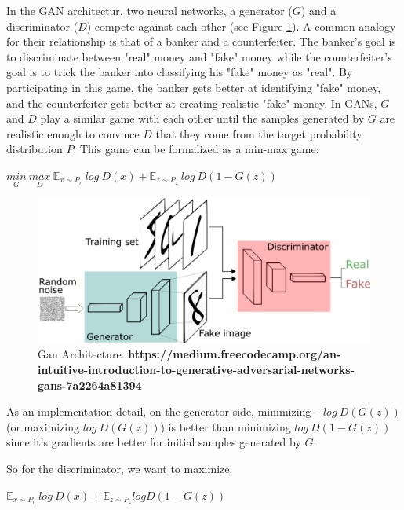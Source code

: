 \documentclass{article}
\begin{document}
In the GAN architectur, two neural networks, a generator ($G$) and a discriminator ($D$) compete against each other (see Figure \ref{fig:gan}). A common analogy for their relationship is that of a banker and a counterfeiter. The banker's goal is to discriminate between "real" money and "fake" money while the counterfeiter's goal is to trick the banker into classifying his "fake" money as "real". By participating in this game, the banker gets better at identifying "fake" money, and the counterfeiter gets better at creating realistic "fake" money. In GANs, $G$ and $D$ play a similar game with each other until the samples generated by $G$ are realistic enough to convince $D$ that they come from the target probability distribution $P$. This game can be formalized as a min-max game:

\begin{center}
	$\underset{G}{min}~\underset{D}{max}~\mathbb{E}_{x \sim P_r}~log~D(x) + \mathbb{E}_{z \sim P_z}~log~D(1-G(z))$
\end{center}

\begin{figure}[h!]
	\centering
	\includegraphics[width=\linewidth]{media/gan.png}
	\caption{Gan Architecture.  \textbf{https://medium.freecodecamp.org/an-intuitive-introduction-to-generative-adversarial-networks-gans-7a2264a81394}}
	\label{fig:gan}
\end{figure}

As an implementation detail, on the generator side, minimizing $-log~D(G(z))$ (or maximizing $log~D(G(z))$) is better than minimizing $log~D(1-G(z))$ since it's gradients are better for initial samples generated by $G$.

So for the discriminator, we want to maximize:

\begin{center}
	$\mathbb{E}_{x \sim P_r}~log~D(x) + \mathbb{E}_{z \sim P_z} log D(1-G(z))$
\end{center}
\end{document}
